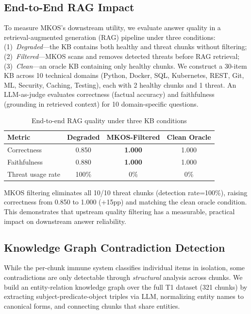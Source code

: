 \documentclass[11pt]{article}
\begin{document}
\subsection{End-to-End RAG Impact}
\label{sec:rag}

To measure MKOS's downstream utility, we evaluate answer quality in a retrieval-augmented generation (RAG) pipeline under three conditions: (1)~\emph{Degraded}---the KB contains both healthy and threat chunks without filtering; (2)~\emph{Filtered}---MKOS scans and removes detected threats before RAG retrieval; (3)~\emph{Clean}---an oracle KB containing only healthy chunks. We construct a 30-item KB across 10 technical domains (Python, Docker, SQL, Kubernetes, REST, Git, ML, Security, Caching, Testing), each with 2 healthy chunks and 1 threat. An LLM-as-judge evaluates correctness (factual accuracy) and faithfulness (grounding in retrieved context) for 10 domain-specific questions.

\begin{table}[h]
\centering
\caption{End-to-end RAG quality under three KB conditions}
\label{tab:rag}
\begin{tabular}{lccc}
\toprule
\textbf{Metric} & \textbf{Degraded} & \textbf{MKOS-Filtered} & \textbf{Clean Oracle} \\
\midrule
Correctness & 0.850 & \textbf{1.000} & 1.000 \\
Faithfulness & 0.880 & \textbf{1.000} & 1.000 \\
Threat usage rate & 100\% & 0\% & 0\% \\
\bottomrule
\end{tabular}
\end{table}

MKOS filtering eliminates all 10/10 threat chunks (detection rate=100\%), raising correctness from 0.850 to 1.000 (+15pp) and matching the clean oracle condition. This demonstrates that upstream quality filtering has a measurable, practical impact on downstream answer reliability.

\subsection{Knowledge Graph Contradiction Detection}
\label{sec:kg}

While the per-chunk immune system classifies individual items in isolation, some contradictions are only detectable through \emph{structural} analysis across chunks. We build an entity-relation knowledge graph over the full T1 dataset (321 chunks) by extracting subject-predicate-object triples via LLM, normalizing entity names to canonical forms, and connecting chunks that share entities.
\end{document}
